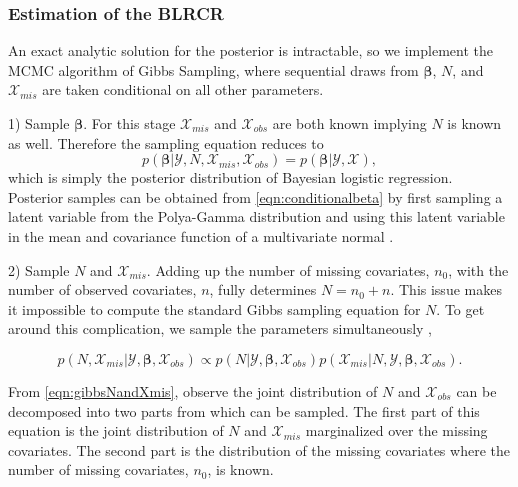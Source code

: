 \documentclass[
  12pt,
]{article}
\begin{document}
\subsubsection{Estimation of the BLRCR}
\label{sec:estimationBLRCRMCMC}

An exact analytic solution for the posterior is intractable, so we
implement the MCMC algorithm of Gibbs Sampling, where sequential draws
from \(\boldsymbol{\beta}\), \(N\), and \(\mathcal{X}_{mis}\) are taken
conditional on all other parameters.

\begin{list}{}{}

\item[1)] Sample $\boldsymbol{\beta}$.  For this stage $\mathcal{X}_{mis}$ and $\mathcal{X}_{obs}$ are both known implying $N$ is known as well.  Therefore the sampling equation reduces to 
\begin{equation}
\label{eqn:conditionalbeta}
p(\boldsymbol{\beta}|\mathcal{Y},N,\mathcal{X}_{mis},\mathcal{X}_{obs}) = p(\boldsymbol{\beta}|\mathcal{Y},\mathcal{X}), 
\end{equation}
which is simply the posterior distribution of Bayesian logistic regression.   Posterior samples can be obtained from \autoref{eqn:conditionalbeta} by first sampling a latent variable from the Polya-Gamma distribution and using this latent variable in the mean and covariance function of a multivariate normal \citep{polson_bayesian_2013}.

\item[2)] Sample $N$ and $\mathcal{X}_{mis}$.  Adding up the number of missing covariates, $n_0$, with the number of observed covariates, $n$, fully determines $N=n_0+n$.  This issue makes it impossible to compute the standard Gibbs sampling equation for $N$.  To get around this complication, we sample the parameters simultaneously \citep{basu_bayesian_2001},

\begin{equation}
\label{eqn:gibbsNandXmis}
p(N,\mathcal{X}_{mis}|\mathcal{Y},\boldsymbol{\beta},\mathcal{X}_{obs})\propto p(N|\mathcal{Y},\boldsymbol{\beta},\mathcal{X}_{obs})p(\mathcal{X}_{mis}|N,\mathcal{Y},\boldsymbol{\beta},\mathcal{X}_{obs}).
\end{equation}

From \autoref{eqn:gibbsNandXmis}, observe the joint distribution of $N$ and $\mathcal{X}_{obs}$ can be decomposed into two parts from which can be sampled.  The first part of this equation is the joint distribution of $N$ and $\mathcal{X}_{mis}$ marginalized over the missing covariates.  The second part is the distribution of the missing covariates where the number of missing covariates, $n_0$, is known.


\end{list}
\end{document}
